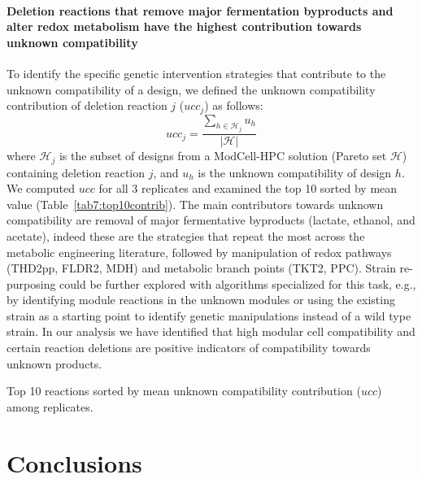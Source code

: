 {\paragraph{Deletion reactions that remove major fermentation byproducts and alter redox metabolism have the highest contribution towards unknown compatibility}

To identify the specific genetic intervention strategies that contribute to
the unknown compatibility of a design,  we defined the unknown compatibility contribution of deletion reaction $j$ ($ucc_j$) as follows:
\begin{equation}
    ucc_j=\frac{\sum\limits_{h\in\mathcal{H}_j} u_h}{|\mathcal{H}|}
\end{equation}
where $\mathcal{H}_j$ is the subset of designs from a ModCell-HPC solution (Pareto set $\mathcal{H}$) containing deletion reaction $j$, and $u_h$ is the unknown compatibility of design $h$.
We computed $ucc$ for all 3 replicates and examined the top 10 sorted by mean value (Table~\ref{tab7:top10contrib}).
The main contributors towards unknown compatibility are removal of major fermentative byproducts (lactate, ethanol, and acetate), indeed these are the strategies that repeat the most across the metabolic engineering literature,\citep{winkler2015} followed by manipulation of redox pathways (THD2pp, FLDR2, MDH) and metabolic branch points (TKT2, PPC).
Strain re-purposing could be further explored with algorithms specialized for this task, e.g., by identifying module reactions in the unknown modules or using the existing strain as a starting point to identify genetic manipulations instead of a wild type strain.
In our analysis we have identified that high modular cell compatibility and certain reaction deletions are positive indicators of compatibility towards unknown products.

\begin{table}[h]
    \caption{Top 10 reactions sorted by mean unknown compatibility contribution ($ucc$) among replicates. }
    \centering
    
    \label{tab7:top10contrib}
\end{table}

\section{Conclusions}

}
